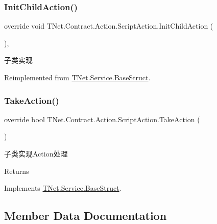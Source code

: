 \subsubsection{\texorpdfstring{Init\+Child\+Action()}{InitChildAction()}}
{\footnotesize\ttfamily override void T\+Net.\+Contract.\+Action.\+Script\+Action.\+Init\+Child\+Action (\begin{DoxyParamCaption}{ }\end{DoxyParamCaption})\hspace{0.3cm}{\ttfamily [protected]}, {\ttfamily [virtual]}}



子类实现 



Reimplemented from \mbox{\hyperlink{class_t_net_1_1_service_1_1_base_struct_ad2af7304687799ec4a7fe2036643d407}{T\+Net.\+Service.\+Base\+Struct}}.

\mbox{\label{class_t_net_1_1_contract_1_1_action_1_1_script_action_a93573bb7b31b15eccb5268ac64e2c41b}} 
\subsubsection{\texorpdfstring{Take\+Action()}{TakeAction()}}
{\footnotesize\ttfamily override bool T\+Net.\+Contract.\+Action.\+Script\+Action.\+Take\+Action (\begin{DoxyParamCaption}{ }\end{DoxyParamCaption})\hspace{0.3cm}{\ttfamily [virtual]}}



子类实现\+Action处理 

\begin{DoxyReturn}{Returns}

\end{DoxyReturn}


Implements \mbox{\hyperlink{class_t_net_1_1_service_1_1_base_struct_a5a1250b74d925d42066aebdefa36f54a}{T\+Net.\+Service.\+Base\+Struct}}.



\subsection{Member Data Documentation}
\mbox{\label{class_t_net_1_1_contract_1_1_action_1_1_script_action_a6f8c50eaddc7bc7744cbebd589838bef}} 
